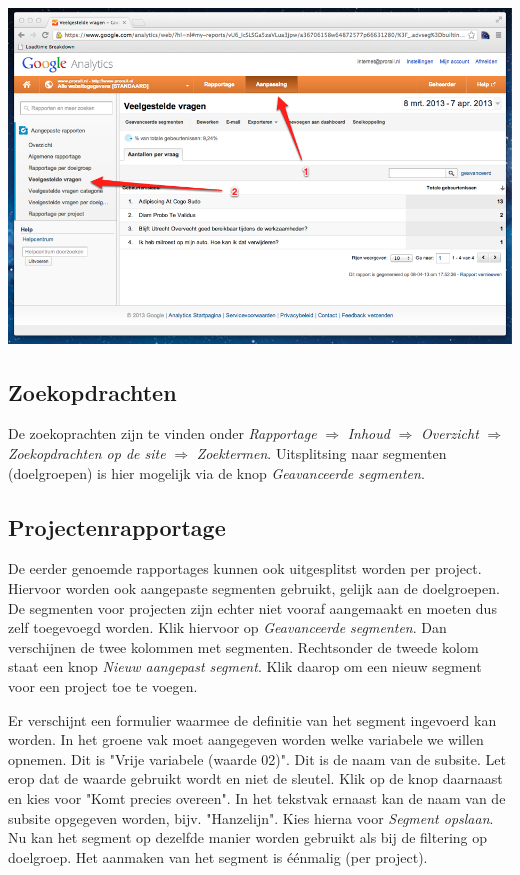 \includegraphics[width=\textwidth]{img/stats7.png}


\clearpage
\subsection{Zoekopdrachten}

De zoekoprachten zijn te vinden onder \emph{Rapportage} $\Rightarrow$ \emph{Inhoud} $\Rightarrow$ \emph{Overzicht} $\Rightarrow$ \emph{Zoekopdrachten op de site} $\Rightarrow$ \emph{Zoektermen}. Uitsplitsing naar segmenten (doelgroepen) is hier mogelijk via de knop \emph{Geavanceerde segmenten}.

\subsection{Projectenrapportage}
De eerder genoemde rapportages kunnen ook uitgesplitst worden per project. Hiervoor worden ook aangepaste segmenten gebruikt, gelijk aan de doelgroepen. De segmenten voor projecten zijn echter niet vooraf aangemaakt en moeten dus zelf toegevoegd worden. Klik hiervoor op \emph{Geavanceerde segmenten}. Dan verschijnen de twee kolommen met segmenten. Rechtsonder de tweede kolom staat een knop \emph{Nieuw aangepast segment}. Klik daarop om een nieuw segment voor een project toe te voegen.

Er verschijnt een formulier waarmee de definitie van het segment ingevoerd kan worden. In het groene vak moet aangegeven worden welke variabele we willen opnemen. Dit is "Vrije variabele (waarde 02)". Dit is de naam van de subsite. Let erop dat de waarde gebruikt wordt en niet de sleutel. Klik op de knop daarnaast en kies voor "Komt precies overeen". In het tekstvak ernaast kan de naam van de subsite opgegeven worden, bijv. "Hanzelijn". Kies hierna voor \emph{Segment opslaan}. Nu kan het segment op dezelfde manier worden gebruikt als bij de filtering op doelgroep. Het aanmaken van het segment is \'{e}\'{e}nmalig (per project).
\\

